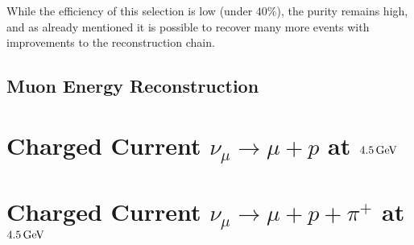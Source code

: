 While the efficiency of this selection is low (under $40\%$), the purity remains high, and as already mentioned it is possible to recover many more events with improvements to the reconstruction chain.

\subsection{Muon Energy Reconstruction}

\section{Charged Current $\nu_\mu \rightarrow \mu + p$ at $4.5\,\mathrm{GeV}$}

\section{Charged Current $\nu_\mu \rightarrow \mu + p + \pi^+$ at $4.5\,\mathrm{GeV}$}

